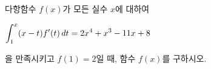 다항함수 $f(x)$가 모든 실수 $x$에 대하여 \par\smallskip\noindent\hspace*{1.5em}$\displaystyle\int_{1}^{x}(x-t)f'(t)\mkern3mu dt=2x^4+x^3-11x+8$\par\smallskip\noindent 을 만족시키고 $f(1)=2$일 때, 함수 $f(x)$를 구하시오.
